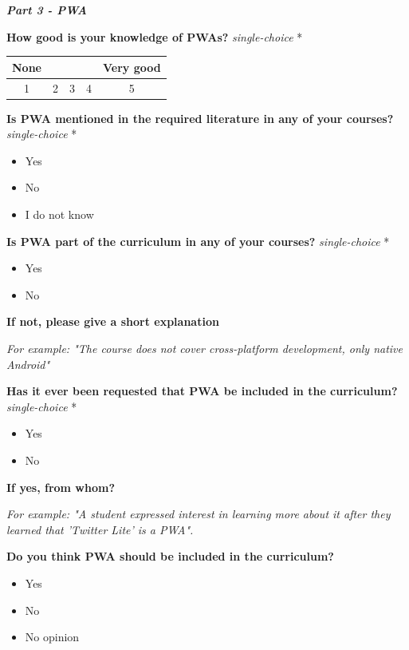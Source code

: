 \documentclass[a4paper,12pt]{article}
\begin{document}
\quad

\quad

\textbf{\textit{Part 3 - PWA}}

\textbf{How good is your knowledge of PWAs?}  \textit{single-choice} *

\begin{tabular}{ccccc}
    None & & & & Very good \\
    \hline
    \multicolumn{1}{|c|}{1} & \multicolumn{1}{c|}{2} & \multicolumn{1}{c|}{3} & \multicolumn{1}{c|}{4} & \multicolumn{1}{c|}{5} \\
     \hline
\end{tabular}

\quad

\quad

\textbf{Is PWA mentioned in the required literature in any of your courses?} \textit{single-choice} *
\begin{itemize}
    \item Yes
    \item No
    \item I do not know
\end{itemize}

\textbf{Is PWA part of the curriculum in any of your courses?} \textit{single-choice} *
\begin{itemize}
    \item Yes
    \item No
\end{itemize}

\textbf{If not, please give a short explanation}

\textit{For example: "The course does not cover cross-platform development, only native Android"}

\quad

\textbf{Has it ever been requested that PWA be included in the curriculum?} \textit{single-choice} *
\begin{itemize}
    \item Yes
    \item No
\end{itemize}

\textbf{If yes, from whom?}

\textit{For example: "A student expressed interest in learning more about it after they learned that 'Twitter Lite' is a PWA".}

\quad

\textbf{Do you think PWA should be included in the curriculum?}
\begin{itemize}
    \item Yes
    \item No
    \item No opinion
\end{itemize}
\end{document}
